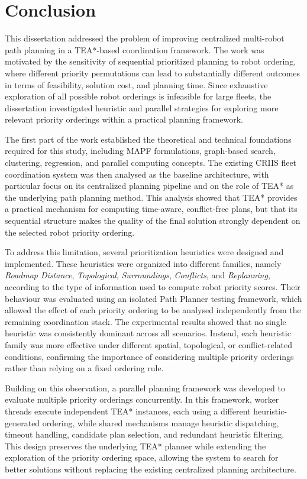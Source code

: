 \chapter{Conclusion}
\label{chap:ch9}
\hspace{\parindent}
This dissertation addressed the problem of improving centralized multi-robot path planning in a
TEA*-based coordination framework. The work was motivated by the sensitivity of sequential
prioritized planning to robot ordering, where different priority permutations can lead to substantially
different outcomes in terms of feasibility, solution cost, and planning time. Since exhaustive
exploration of all possible robot orderings is infeasible for large fleets, the dissertation investigated
heuristic and parallel strategies for exploring more relevant priority orderings within a practical
planning framework.

The first part of the work established the theoretical and technical foundations required for this
study, including MAPF formulations, graph-based search, clustering, regression, and parallel
computing concepts. The existing CRIIS fleet coordination system was then analysed as the baseline
architecture, with particular focus on its centralized planning pipeline and on the role of TEA* as the
underlying path planning method. This analysis showed that TEA* provides a practical mechanism
for computing time-aware, conflict-free plans, but that its sequential structure makes the quality of
the final solution strongly dependent on the selected robot priority ordering.

To address this limitation, several prioritization heuristics were designed and implemented. These
heuristics were organized into different families, namely \textit{Roadmap Distance},
\textit{Topological}, \textit{Surroundings}, \textit{Conflicts}, and \textit{Replanning}, according to the
type of information used to compute robot priority scores. Their behaviour was evaluated using an
isolated Path Planner testing framework, which allowed the effect of each priority ordering to be
analysed independently from the remaining coordination stack. The experimental results showed
that no single heuristic was consistently dominant across all scenarios. Instead, each heuristic family
was more effective under different spatial, topological, or conflict-related conditions, confirming the
importance of considering multiple priority orderings rather than relying on a fixed ordering rule.

Building on this observation, a parallel planning framework was developed to evaluate multiple
priority orderings concurrently. In this framework, worker threads execute independent TEA*
instances, each using a different heuristic-generated ordering, while shared mechanisms manage
heuristic dispatching, timeout handling, candidate plan selection, and redundant heuristic filtering.
This design preserves the underlying TEA* planner while extending the exploration of the priority
ordering space, allowing the system to search for better solutions without replacing the existing
centralized planning architecture.

